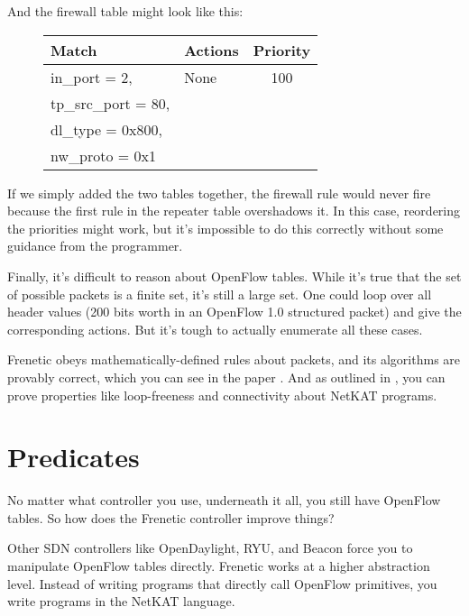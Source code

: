 \bigskip

And the firewall table might look like this:

\bigskip

\begin{figure}[h]
\centering
\begin{tabularx}{2.85in}{|l|l|c|}
\hline\hline
Match & Actions & Priority
\\ \hline
in\_port = 2, & None & 100
\\
tp\_src\_port = 80, &  & 
\\
dl\_type = 0x800, & &
\\
nw\_proto = 0x1 & &
\\ \hline\hline
\end{tabularx}
\end{figure}

If we simply added the two tables together, the firewall rule would never fire because the first rule in 
the repeater table overshadows it.  In this case, reordering the priorities might work, but it's impossible to 
do this correctly without some guidance from the programmer.  

Finally, it's difficult to reason about OpenFlow tables.
While it's true that the set of possible packets is a finite set, it's still a large set.  One could loop
over all header values (200 bits worth in an OpenFlow 1.0 structured packet) 
and give the corresponding actions.  But it's tough to actually enumerate all these cases.

Frenetic obeys mathematically-defined rules about packets, and its algorithms are provably correct, which 
you can see in the paper \citet{DBLP:journals/corr/SmolkaEFG15}. 
And as outlined in \citet{Foster:2015:CDP:2775051.2677011}, you can prove properties like loop-freeness and
connectivity about NetKAT programs.  

\section{Predicates}

No matter what controller you use, underneath it all, you still have OpenFlow tables.
So how does the Frenetic controller improve things? 

Other SDN controllers like OpenDaylight, RYU, and Beacon force you to manipulate 
OpenFlow tables directly.  
Frenetic works at a higher abstraction level.  
Instead of writing programs that directly call OpenFlow primitives, you write programs in 
the NetKAT language.

